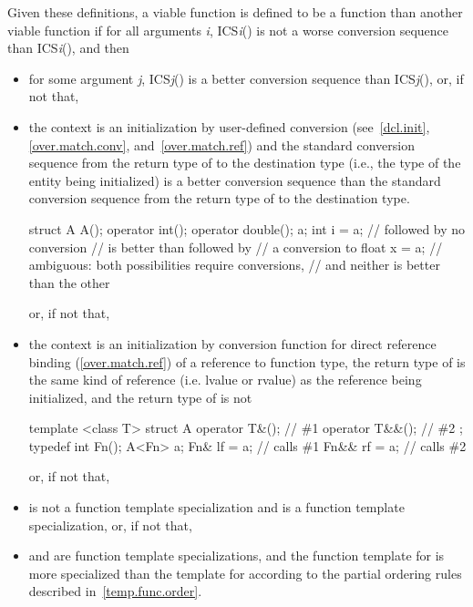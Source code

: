 Given these definitions, a viable function
is defined
to be a
function than another viable function
if
for all arguments
\textit{i},
ICS\textit{i}() is not a worse conversion
sequence than ICS\textit{i}(), and then
\begin{itemize}

\item
for some argument
\textit{j},
ICS\textit{j}() is a better conversion
sequence than ICS\textit{j}(), or, if not that,

\item
the context is an initialization by user-defined conversion
(see~\ref{dcl.init},
\ref{over.match.conv}, and~\ref{over.match.ref})
and the standard conversion sequence from the return type of
to the destination type (i.e., the type of the entity being initialized)
is a better conversion sequence than the standard conversion sequence
from the return type of
to the destination type.
\enterexample

\begin{codeblock}
struct A {
  A();
  operator int();
  operator double();
} a;
int i = a;                      //  followed by no conversion
                                // is better than  followed by
                                // a conversion to 
float x = a;                    // ambiguous: both possibilities require conversions,
                                // and neither is better than the other
\end{codeblock}
\exitexample
or, if not that,

\item the context is an initialization by conversion function for direct
reference binding (\ref{over.match.ref}) of a reference to function type, the
return type of  is the same kind of reference (i.e. lvalue or rvalue)
as the reference being initialized, and the return type of  is not
\enterexample

\begin{codeblock}
template <class T> struct A {
  operator T&();        // \#1
  operator T&&();       // \#2
};
typedef int Fn();
A<Fn> a;
Fn& lf = a;             // calls \#1
Fn&& rf = a;            // calls \#2
\end{codeblock}

\exitexample
or, if not that,

\item
{}
is not a function template specialization and
is a
function template
specialization, or, if not that,

\item
{}
and
are
function template specializations,
and the function template
for
is more specialized than the template for
according to the partial ordering rules described in~\ref{temp.func.order}.
\end{itemize}

